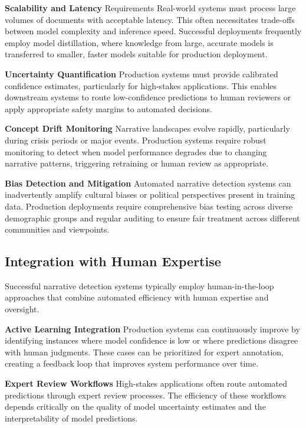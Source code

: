 \textbf{Scalability and Latency} Requirements Real-world systems must process large volumes of documents with acceptable latency. This often necessitates trade-offs between model complexity and inference speed. Successful deployments frequently employ model distillation, where knowledge from large, accurate models is transferred to smaller, faster models suitable for production deployment.

\textbf{Uncertainty Quantification} Production systems must provide calibrated confidence estimates, particularly for high-stakes applications. This enables downstream systems to route low-confidence predictions to human reviewers or apply appropriate safety margins to automated decisions.

\textbf{Concept Drift Monitoring} Narrative landscapes evolve rapidly, particularly during crisis periods or major events. Production systems require robust monitoring to detect when model performance degrades due to changing narrative patterns, triggering retraining or human review as appropriate.

\textbf{Bias Detection and Mitigation} Automated narrative detection systems can inadvertently amplify cultural biases or political perspectives present in training data. Production deployments require comprehensive bias testing across diverse demographic groups and regular auditing to ensure fair treatment across different communities and viewpoints.

\subsection{Integration with Human Expertise}

Successful narrative detection systems typically employ human-in-the-loop approaches that combine automated efficiency with human expertise and oversight.

\textbf{Active Learning Integration} Production systems can continuously improve by identifying instances where model confidence is low or where predictions disagree with human judgments. These cases can be prioritized for expert annotation, creating a feedback loop that improves system performance over time.

\textbf{Expert Review Workflows} High-stakes applications often route automated predictions through expert review processes. The efficiency of these workflows depends critically on the quality of model uncertainty estimates and the interpretability of model predictions.

